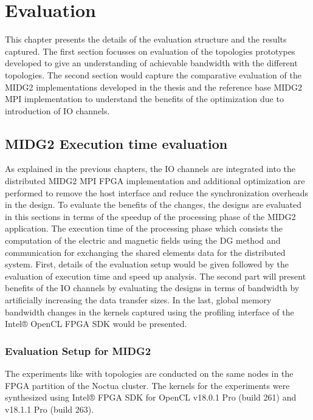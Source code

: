 \chapter{Evaluation}
\label{cha:Evaluation}

This chapter presents the details of the evaluation structure and the results
captured. The first section focusses on evaluation of the topologies prototypes
developed to give an understanding of achievable bandwidth with the different
topologies. The second section would capture the comparative evaluation of
the MIDG2 implementations developed in the thesis and the reference base MIDG2
MPI implementation to understand the benefits of the optimization due to introduction
of IO channels.


\section{MIDG2 Execution time evaluation}

As explained in the previous chapters, the IO channels are integrated into the
distributed MIDG2 MPI FPGA implementation and additional optimization are performed
to remove the host interface and reduce the synchronization overheads in the design.
To evaluate the benefits of the changes, the designs are evaluated in this sections
in terms of the speedup of the processing phase of the MIDG2 application. The execution
time of the processing phase which consists the computation of the electric
and magnetic fields using the \ac{DG} method and communication for exchanging the
shared elements data for the distributed system. First, details of the
evaluation setup would be given followed by the evaluation of execution
time and speed up analysis. The second part will present benefits of the IO
channels by evaluating the designs in terms of bandwidth by artificially
increasing the data transfer sizes. In the last, global memory bandwidth
changes in the kernels captured using the profiling interface of the Intel®
OpenCL FPGA SDK would be presented.

\subsection{Evaluation Setup for MIDG2}

The experiments like with topologies are conducted on the same
nodes in the FPGA partition of the Noctua cluster. The kernels
for the experiments were synthesized using Intel® FPGA SDK for OpenCL
v18.0.1 Pro (build 261) and v18.1.1 Pro (build 263).

